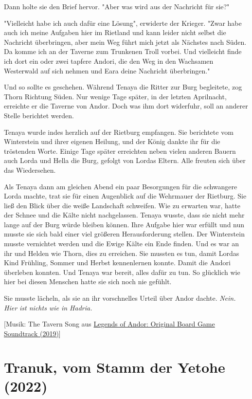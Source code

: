 \documentclass[10pt, a4paper, oneside]{book}
\newcommand{\storytext}[1]{%
    \section{#1}%
    \label{Storytext: #1}%
}
\newcommand{\refprodukt}[1]{\hyperref[Produkt: #1]{#1}}
\begin{document}
\begin{multicols}{2}
Dann holte sie den Brief hervor. "Aber was wird aus der Nachricht für sie?"

"Vielleicht habe ich auch dafür eine Lösung", erwiderte der Krieger. "Zwar habe auch ich meine Aufgaben hier im Rietland und kann leider nicht selbst die Nachricht überbringen, aber mein Weg führt mich jetzt als Nächstes nach Süden. Da komme ich an der Taverne zum Trunkenen Troll vorbei. Und vielleicht finde ich dort ein oder zwei tapfere Andori, die den Weg in den Wachsamen Westerwald auf sich nehmen und Eara deine Nachricht überbringen."

Und so sollte es geschehen. Während Tenaya die Ritter zur Burg begleitete, zog Thorn Richtung Süden. Nur wenige Tage später, in der letzten Aprilnacht, erreichte er die Taverne von Andor. Doch was ihm dort widerfuhr, soll an anderer Stelle berichtet werden. 

Tenaya wurde indes herzlich auf der Rietburg empfangen. Sie berichtete vom Winterstein und ihrer eigenen Heilung, und der König dankte ihr für die tröstenden Worte. Einige Tage später erreichten neben vielen anderen Bauern auch Lorda und Hella die Burg, gefolgt von Lordas Eltern. Alle freuten sich über das Wiedersehen. 

Als Tenaya dann am gleichen Abend ein paar Besorgungen für die schwangere Lorda machte, trat sie für einen Augenblick auf die Wehrmauer der Rietburg. Sie ließ den Blick über die weiße Landschaft schweifen. Wie zu erwarten war, hatte der Schnee und die Kälte nicht nachgelassen. Tenaya wusste, dass sie nicht mehr lange auf der Burg würde bleiben können. Ihre Aufgabe hier war erfüllt und nun musste sie sich bald einer viel größeren Herausforderung stellen. Der Winterstein musste vernichtet werden und die Ewige Kälte ein Ende finden. Und es war an ihr und Helden wie Thorn, dies zu erreichen. Sie mussten es tun, damit Lordas Kind Frühling, Sommer und Herbst kennenlernen konnte. Damit die Andori überleben konnten. Und Tenaya war bereit, alles dafür zu tun. So glücklich wie hier bei diesen Menschen hatte sie sich noch nie gefühlt. 

Sie musste lächeln, als sie an ihr vorschnelles Urteil über Andor dachte. \textit{Nein. Hier ist nichts wie in Hadria.}\bigskip

[Musik: The Tavern Song aus \refprodukt{Legends of Andor: Original Board Game Soundtrack (2019)}]





\storytext{Tranuk, vom Stamm der Yetohe (2022)}


\end{multicols}
\end{document}

